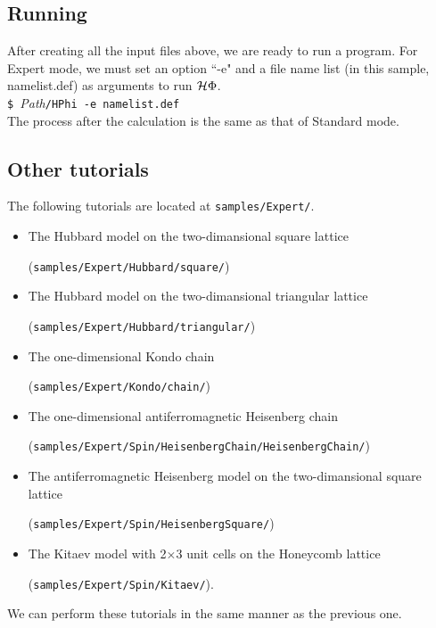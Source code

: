 \subsection{Running}
After creating all the input files above, we are ready to run a program.
For Expert mode, we must set an option ``-e" and a file name list (in this sample, namelist.def) as arguments to run $\mathcal{H} \Phi$.\\
\verb|$ |\textit{Path}\verb|/HPhi -e namelist.def|\\
The process after the calculation is the same as that of Standard mode.

\subsection{Other tutorials}

The following tutorials are located at \verb|samples/Expert/|.

\begin{itemize}
\item The Hubbard model on the two-dimansional square lattice

  (\verb|samples/Expert/Hubbard/square/|)
\item The Hubbard model on the two-dimansional triangular lattice
  
  (\verb|samples/Expert/Hubbard/triangular/|)
\item The one-dimensional Kondo chain

  (\verb|samples/Expert/Kondo/chain/|)
\item The one-dimensional antiferromagnetic Heisenberg chain
  
  (\verb|samples/Expert/Spin/HeisenbergChain/HeisenbergChain/|)
\item The antiferromagnetic Heisenberg model on the two-dimansional square lattice
  
  (\verb|samples/Expert/Spin/HeisenbergSquare/|)
      
\item The Kitaev model with 2$\times$3 unit cells on the Honeycomb lattice

  (\verb|samples/Expert/Spin/Kitaev/|).

\end{itemize}

We can perform these tutorials in the same manner as the previous one.

\newpage
